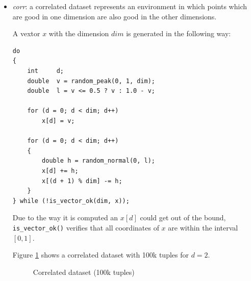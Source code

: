 \begin{itemize}
\item \emph{corr}: 
a correlated dataset represents an environment in which points which
are good in one dimension are also good in the other dimensions. 


A vextor $x$ with the dimension $dim$ is generated in the following way:

\begin{lstlisting}
do
{
	int		d;
	double	v = random_peak(0, 1, dim);
	double	l = v <= 0.5 ? v : 1.0 - v;
	
	for (d = 0; d < dim; d++)
		x[d] = v;

	for (d = 0; d < dim; d++)
	{
		double h = random_normal(0, l);
		x[d] += h;
		x[(d + 1) % dim] -= h;
	}
} while (!is_vector_ok(dim, x));
\end{lstlisting}

Due to the way it is computed an $x[d]$ could get out of the bound,
\lstinline{is_vector_ok()} verifies that all coordinates of $x$ are
within the interval $[0,1]$.

Figure \ref{fig:density-2d-c2d1e5} shows a correlated dataset with
100k tuples for $d = 2$.

\begin{figure}[htbp]
\centering
{}%
%
\caption{Correlated dataset (100k tuples)}%
\label{fig:density-2d-c2d1e5}%
\end{figure}



\end{itemize}
